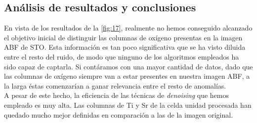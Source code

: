 \subsection{Análisis de resultados y conclusiones}

En vista de los resultados de la \autoref{fig:17}, realmente no hemos conseguido alcanzado el objetivo inicial de distinguir las columnas de oxígeno presentas en la imagen ABF de STO. Esta información es tan poco significativa que se ha visto diluida entre el resto del ruido, de modo que ninguno de los algoritmos empleados ha sido capaz de captarla. Si contáramos con una mayor cantidad de datos, dado que las columnas de oxígeno siempre van a estar presentes en nuestra imagen ABF, a la larga éstas comenzarían a ganar relevancia entre el resto de anomalías.\\

A pesar de este hecho, la eficiencia de las técnicas de \textit{denoising} que hemos empleado es muy alta. Las columnas de Ti y Sr de la celda unidad procesada han quedado mucho mejor definidas en comparación a las de la imagen original. 
